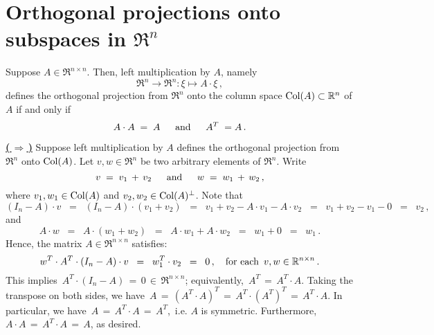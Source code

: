 

\section{Orthogonal projections onto subspaces in $\Re^{n}$}
\setcounter{theorem}{0}
\setcounter{equation}{0}

\renewcommand{\theenumi}{\roman{enumi}}
\renewcommand{\labelenumi}{\textnormal{(\theenumi)}$\;\;$}


\begin{proposition}
\mbox{}\vskip 0.1cm\noindent
Suppose $A \in \Re^{n \times n}$.
Then, left multiplication by $A$, namely
\begin{equation*}
\Re^{n} \longrightarrow \Re^{n} : \xi \longmapsto A\cdot\xi\,,
\end{equation*}
defines the orthogonal projection from $\Re^{n}$ onto the column space
$\Col(A) \subset \Re^{n}$ of $A$
if and only if
\begin{equation*}
A \cdot A \; = \; A
\quad\;\;\textnormal{and}\quad\;\;
A^{T} \; = A\,.
\end{equation*}
\end{proposition}
\proof
\vskip 0.1cm
\noindent
\underline{\textbf{(\,$\Longrightarrow$\,)}}\quad
Suppose left multiplication by $A$ defines the orthogonal projection
from $\Re^{n}$ onto $\Col(A)$.
Let $v, w \in \Re^{n}$ be two arbitrary elements of $\Re^{n}$.
Write
\begin{equation*}
v \;=\; v_{1} \,+\, v_{2}
\quad\;\;\textnormal{and}\quad\;\;
w \;=\; w_{1} \,+\, w_{2}\,,
\end{equation*}
where $v_{1}, w_{1} \in \Col(A)$ and $v_{2}, w_{2} \in \Col(A)^{\perp}$.
Note that
\begin{equation*}
(I_{n} - A) \cdot v
\;\;=\;\;
	(I_{n} - A) \cdot (v_{1} + v_{2})
\;\;=\;\;
	v_{1} + v_{2} - A \cdot v_{1} - A \cdot v_{2}
\;\;=\;\;
	v_{1} + v_{2} - v_{1} - 0
\;\;=\;\;
	v_{2}\,,
\end{equation*}
and
\begin{equation*}
A\cdot w
\;\;=\;\;
	A\cdot(w_{1} + w_{2})
\;\;=\;\;
	A \cdot w_{1} + A \cdot w_{2}
\;\;=\;\;
	w_{1} + 0
\;\;=\;\;
	w_{1}\,.
\end{equation*}
Hence, the matrix $A \in \Re^{n \times n}$ satisfies:
\begin{equation*}
w^{T} \cdot A^{T} \cdot (I_{n} - A) \cdot v
\;\;=\;\;
	w_{1}^{T} \cdot v_{2}
\;\;=\;\;
	0\,,
\quad\textnormal{for each \,$v, w \in \Re^{n \times n}$}\,.
\end{equation*}
This implies \,$A^{T} \cdot (I_{n} - A) \,=\, 0 \,\in\, \Re^{n \times n}$;
equivalently, \,$A^{T} \,=\, A^{T} \cdot A$.
Taking the transpose on both sides, we have
\,$A \,=\, (A^{T} \cdot A)^{T} \,=\, A^{T} \cdot (A^{T})^{T} \,=\, A^{T} \cdot A$.
In particular, we have \,$A \,=\, A^{T} \cdot A \,=\, A^{T}$,\, i.e. $A$ is symmetric.
Furthermore, $A \cdot A \,=\, A^{T} \cdot A \,=\, A$, as desired.

